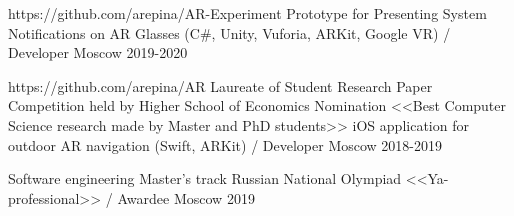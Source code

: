 \vspace{-0.5cm}


\vspace{0cm}\begin{cventries}
	
	
\cventry
{https://github.com/arepina/AR-Experiment
} %
{Prototype for Presenting System Notifications on AR Glasses (C\#, Unity, Vuforia, ARKit, Google VR) / Developer} %
{Moscow} %
{2019-2020} %
{}

\cventry
{https://github.com/arepina/AR
	\newline Laureate of Student Research Paper Competition held by Higher School of Economics
	\newline Nomination <<Best Computer Science research made by Master and PhD students>>
} %
{iOS application for outdoor AR navigation  (Swift, ARKit) / Developer} %
{Moscow} %
{2018-2019} %
{}

\cventry
{Software engineering Master's track} %
{Russian National Olympiad <<Ya-professional>> / Awardee} %
{Moscow} %
{2019} %
{}	
	

		
	
	

\end{cventries}

